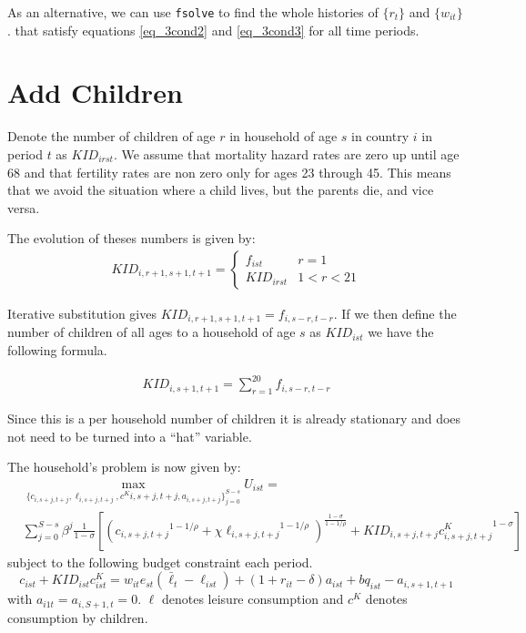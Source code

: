 \documentclass[letterpaper,12pt]{article}
\theoremstyle{definition}
\numberwithin{equation}{section}
\begin{document}
\begin{spacing}{1.5}
	As an alternative, we can use \texttt{fsolve} to find the whole histories of $\{r_t\}$ and $\{w_{it}\}$. that satisfy equations \eqref{eq_3cond2} and \eqref{eq_3cond3} for all time periods.

\newpage
\section{Add Children}
	Denote the number of children of age $r$ in household of age $s$ in country $i$ in period $t$ as $KID_{irst}$.  We assume that mortality hazard rates are zero up until age 68 and that fertility rates are non zero only for ages 23 through 45.  This means that we avoid the situation where a child lives, but the parents die, and vice versa.

	The evolution of theses numbers is given by:
	\begin{align}
		KID_{i,r+1,s+1,t+1} = \left\{ \begin{matrix} f_{ist} & r=1 \\
		KID_{irst} & 1<r<21\end{matrix} \right. \nonumber
	\end{align}

	Iterative substitution gives $KID_{i,r+1,s+1,t+1} = f_{i,s-r,t-r}$.  If we then define the number of children of all ages to a household of age $s$ as $KID_{ist}$ we have the following formula.

	\begin{align}
		KID_{i,s+1,t+1} = \sum_{r=1}^{20} f_{i,s-r,t-r}
	\end{align}

	Since this is a per household number of children it is already stationary and does not need to be turned into a ``hat'' variable.

	The household's problem is now given by:
	\begin{equation}
		\begin{split}
		& \max_{\{c_{i,s+j,t+j},\ell_{i,s+j,t+j},c^K{i,s+j,t+j},a_{i,s+j,t+j}\}_{j=0}^{S-s}} U_{ist} = \\
		& \sum_{j=0}^{S-s} \beta^j \frac{1}{1-\sigma} \left[ \left( {c_{i,s+j,t+j}}^{1-1/\rho} + \chi {\ell_{i,s+j,t+j}}^{1-1/\rho}\right)^{\tfrac{{1-\sigma}}{1-1/\rho}} + KID_{i,s+j,t+j}{c^K_{i,s+j,t+j}}^{1-\sigma}\right] \nonumber
		\end{split}
	\end{equation}
	subject to the following budget constraint each period.
	\begin{equation} \label{eq_4bc}
		c_{ist} + KID_{ist}c^K_{ist} = w_{it} e_{st} (\bar \ell_t -\ell_{ist}) + (1+r_{it}-\delta)a_{ist} + bq_{ist} - a_{i,s+1,t+1}
	\end{equation}
	with $a_{i1t} = a_{i,S+1,t} = 0$.  $\ell$ denotes leisure consumption and $c^K$ denotes consumption by children.


\end{spacing}
\end{document}
